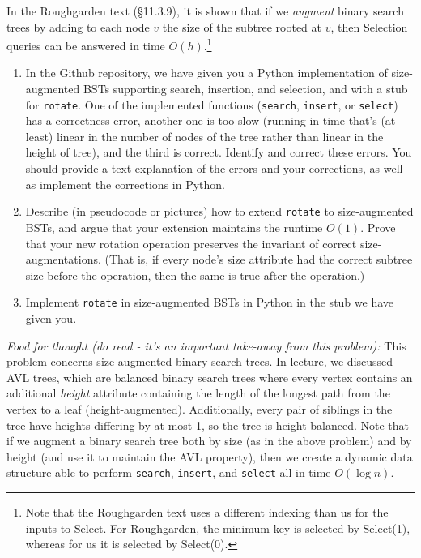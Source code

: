 \documentclass[11pt]{article}
\begin{document}
\begin{enumerate}
    In the Roughgarden text (\S11.3.9), it is shown that if we {\em augment} binary search trees by adding to each node $v$ the size of the subtree rooted at $v$, then Selection queries can be answered in time $O(h)$.\footnote{Note that the Roughgarden text uses a different indexing than us for the inputs to Select. For Roughgarden, the minimum key is selected by Select(1), whereas for us it is selected by Select(0).}
    
    \begin{enumerate}
        \item In the Github repository, we have given you a Python implementation of size-augmented BSTs supporting search, insertion, and selection, and with a stub for \texttt{rotate}. One of the implemented functions (\texttt{search}, \texttt{insert}, or \texttt{select}) has a correctness error, another one is too slow (running in time that's (at least) linear in the number of nodes of the tree rather than linear in the height of tree), and the third is correct. 
        Identify and correct these errors. You should provide a text explanation of the errors and your corrections, as well as implement the corrections in Python.
        
        \item Describe (in pseudocode or pictures) how to extend \texttt{rotate} to size-augmented BSTs, and argue that your extension maintains the runtime $O(1)$. Prove that your new rotation operation preserves the invariant of correct size-augmentations. (That is, if every node's size attribute had the correct subtree size before the operation, then the same is true after the operation.)
        
        \item Implement \texttt{rotate} in size-augmented BSTs in Python in the stub we have given you.
    
    \end{enumerate}
    
    \emph{Food for thought (do read - it's an important take-away from this problem):} This problem concerns size-augmented binary search trees. In lecture, we discussed AVL trees, which are balanced binary search trees where every vertex contains an additional \textit{height} attribute containing the length of the longest path from the vertex to a leaf (height-augmented). Additionally, every pair of siblings in the tree have heights differing by at most 1, so the tree is height-balanced. Note that if we augment a binary search tree both by size (as in the above problem) and by height (and use it to maintain the AVL property), then we create a dynamic data structure able to perform \texttt{search}, \texttt{insert}, and \texttt{select} all in time $O(\log n)$. 


\end{enumerate}
\end{document}
